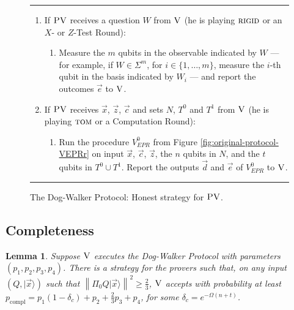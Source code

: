\documentclass[11pt,letter]{article}
\newtheorem{lemma}[theorem]{Lemma}
\theoremstyle{remark}
\theoremstyle{definition}
\newcommand{\ket}[1]{|#1\rangle}
\newcommand{\rigid}{\textsc{rigid}}
\newcommand{\tom}{\textsc{tom}}
\newcommand{\ver}{\textsc{V}}
\newcommand{\pv}{\textsc{PV}}
\newcommand{\norm}[1]{\left\|#1\right\|}
\begin{document}
\begin{figure}[H]
\rule[1ex]{16.5cm}{0.5pt}
\vspace{-20pt}
\begin{enumerate}
  \item If $\pv$ receives a question ${W}$ from $\ver$ (he is playing $\rigid$ or an $X$- or $Z$-Test Round):
\begin{enumerate}
     \item[]  Measure the $m$ qubits in the observable indicated by $W$ --- for example, if $W\in \Sigma^m$, for $i\in \{1,\ldots,m\}$, measure the $i$-th qubit in the basis indicated by $W_i$ --- and report the outcomes $\vec{e}$ to $\ver$.
\end{enumerate}

  \item If $\pv$ receives $\vec{x}$, $\vec{z}$, $\vec{c}$ and sets $N$, $T^0$ and $T^1$ from $\ver$ (he is playing $\tom$ or a Computation Round):
\begin{enumerate}
	\item[] Run the procedure $V_{EPR}^0$ from Figure \ref{fig:original-protocol-VEPRr} on input $\vec{x}$, $\vec{c}$, $\vec{z}$, the $n$ qubits in $N$, and the $t$ qubits in $T^0\cup T^1$. Report the outputs  $\vec{d}$ and $\vec{e}$ of $V_{EPR}^0$ to $\ver$.
\end{enumerate}
\end{enumerate}
\rule[2ex]{16.5cm}{0.5pt}\vspace{-.5cm}
\caption{The Dog-Walker Protocol: Honest strategy for $\pv$.}\label{fig:dogwalker-protocol-PV}
\end{figure}


\subsection{Completeness}

\begin{lemma}\label{lem:dogwalker-completeness}
Suppose $\ver$ executes the Dog-Walker Protocol with parameters $(p_1,p_2,p_3,p_4)$.
There is a strategy for the provers such that, on any input $(Q,\ket{\vec{x}})$
  such that $\norm{\Pi_0 Q\ket{\vec{x}}}^2\geq \frac{2}{3}$, $\ver$ accepts with
  probability at least
  $p_{\mathrm{compl}}=p_1(1-\delta_c)+p_2+\frac{2}{3}p_3+p_4$, for some $\delta_c = e^{-\Omega(n+t)}$.
\end{lemma}
\end{document}
